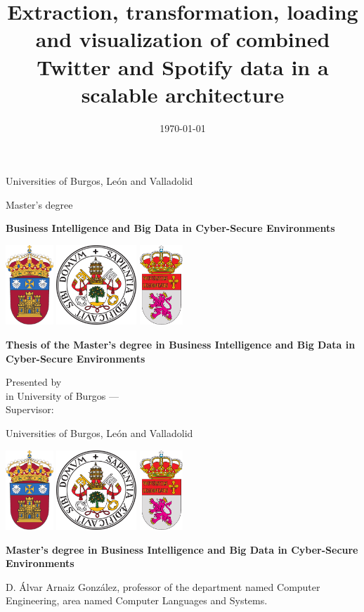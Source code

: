 \documentclass[a4paper,12pt,twoside]{memoir}
\title{Extraction, transformation, loading and visualization of combined Twitter and Spotify data in a scalable architecture}
\author{\nombre}
\date{\today}
\makeatletter
\def\maketitle{
  \null
  \thispagestyle{empty}
\begin{center}%
	{\noindent\Huge Universities of Burgos, León and Valladolid}\vspace{.5cm}%
	
	{\noindent\Large Master's degree}\vspace{.5cm}%
	
	{\noindent\Huge \textbf{Business Intelligence and Big Data in Cyber-Secure Environments}}\vspace{.5cm}%
\end{center}%

\begin{center}%
	\includegraphics[height=3cm]{img/escudoUBU} \hspace{1cm}
	\includegraphics[height=3cm]{img/escudoUVA} \hspace{1cm}
	\includegraphics[height=3cm]{img/escudoULE} \vspace{0.1cm}%
\end{center}%

  \vfill
  \colorbox{cpardoBox}{%
    \begin{minipage}{0.9\textwidth}
      \vspace{.5cm}\large
      \begin{center}
      \textbf{Thesis of the Master's degree in Business Intelligence and Big Data in Cyber-Secure Environments}\vspace{.5cm}\\
      \textbf{\Large\@title{}}
      \end{center}
      \vspace{.2cm}
    \end{minipage}

  }%
  \hfill
  \vfill
  \begin{center}%
  {%
    \noindent\Large
    Presented by \@author{}\\ 
    in University of Burgos --- \@date{}\\
    Supervisor: \@tutor{}\\
  }%
  \end{center}%
  \null
  \cleardoublepage
  }
\makeatother
\begin{document}
\maketitle


\newpage\null\thispagestyle{empty}\newpage


\thispagestyle{empty}


\noindent
\begin{center}%
	{\noindent\Huge Universities of Burgos, León and Valladolid}\vspace{.5cm}%
	
\begin{center}%
	\includegraphics[height=3cm]{img/escudoUBU} \hspace{1cm}
	\includegraphics[height=3cm]{img/escudoUVA} \hspace{1cm}
	\includegraphics[height=3cm]{img/escudoULE} \vspace{1cm}%
\end{center}%

	{\noindent\Large \textbf{Master's degree in Business Intelligence and Big Data in Cyber-Secure Environments}}\vspace{.5cm}%
\end{center}%



\noindent D. Álvar Arnaiz González, professor of the department named Computer Engineering, area named Computer Languages and Systems.
\end{document}
